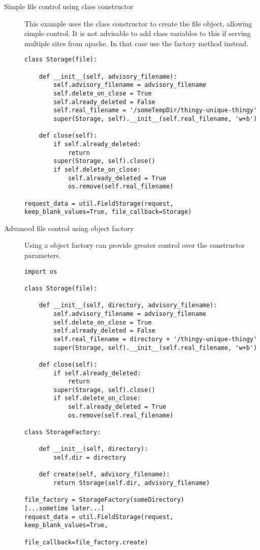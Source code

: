 \begin{description}
  \item[Simple file control using class constructor]

    This example uses the  class constructor to
    create the file object, allowing simple control. It is not 
    advisable to add class variables to this if serving multiple sites
    from apache. In that case use the factory method instead.

\begin{verbatim}
class Storage(file):

    def __init__(self, advisory_filename):
        self.advisory_filename = advisory_filename
        self.delete_on_close = True
        self.already_deleted = False
        self.real_filename = '/someTempDir/thingy-unique-thingy'
        super(Storage, self).__init__(self.real_filename, 'w+b')

    def close(self):
        if self.already_deleted:
            return
        super(Storage, self).close()
        if self.delete_on_close:
            self.already_deleted = True
            os.remove(self.real_filename)

request_data = util.FieldStorage(request, keep_blank_values=True, file_callback=Storage)
\end{verbatim}


  \item[Advanced file control using object factory]

    Using a object factory can provide greater control over the
    constructor parameters.

\begin{verbatim}
import os

class Storage(file):

    def __init__(self, directory, advisory_filename):
        self.advisory_filename = advisory_filename
        self.delete_on_close = True
        self.already_deleted = False
        self.real_filename = directory + '/thingy-unique-thingy'
        super(Storage, self).__init__(self.real_filename, 'w+b')

    def close(self):
        if self.already_deleted:
            return
        super(Storage, self).close()
        if self.delete_on_close:
            self.already_deleted = True
            os.remove(self.real_filename)

class StorageFactory:

    def __init__(self, directory):
        self.dir = directory

    def create(self, advisory_filename):
        return Storage(self.dir, advisory_filename)

file_factory = StorageFactory(someDirectory)
[...sometime later...]
request_data = util.FieldStorage(request, keep_blank_values=True,
                                file_callback=file_factory.create)
\end{verbatim}

\end{description}


